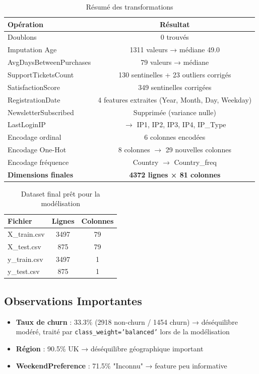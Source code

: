 \documentclass[11pt,a4paper]{article}
\begin{document}
\begin{table}[H]
	\centering
	\caption{Résumé des transformations}
	\label{tab:transformations}
	\begin{tabular}{|l|c|}
		\hline
		\textbf{Opération} & \textbf{Résultat} \\
		\hline
		Doublons & 0 trouvés \\
		\hline
		Imputation Age & 1311 valeurs → médiane 49.0 \\
		\hline
		AvgDaysBetweenPurchases & 79 valeurs → médiane \\
		\hline
		SupportTicketsCount & 130 sentinelles + 23 outliers corrigés \\
		\hline
		SatisfactionScore & 349 sentinelles corrigées \\
		\hline
		RegistrationDate & 4 features extraites (Year, Month, Day, Weekday) \\
		\hline
		NewsletterSubscribed & Supprimée (variance nulle) \\
		\hline
		LastLoginIP & $\rightarrow$ IP1, IP2, IP3, IP4, IP\_Type \\
		\hline
		Encodage ordinal & 6 colonnes encodées \\
		\hline
		Encodage One-Hot & 8 colonnes $\rightarrow$ 29 nouvelles colonnes \\
		\hline
		Encodage fréquence & Country $\rightarrow$ Country\_freq \\
		\hline
		\textbf{Dimensions finales} & \textbf{4372 lignes × 81 colonnes} \\
		\hline
		\end{tabular}
	\end{table}
\begin{table}[H]
	\centering
	\caption{Dataset final prêt pour la modélisation}
	\label{tab:final_data}
	\begin{tabular}{|l|c|c|}
		\hline
		\textbf{Fichier} & \textbf{Lignes} & \textbf{Colonnes} \\
		\hline
		X\_train.csv & 3497 & 79 \\
		X\_test.csv & 875 & 79 \\
		y\_train.csv & 3497 & 1 \\
		y\_test.csv & 875 & 1 \\
		\hline
	\end{tabular}
\end{table}
\subsection{Observations Importantes}
\begin{itemize}
	\item \textbf{Taux de churn} : 33.3\% (2918 non-churn / 1454 churn) → déséquilibre modéré, traité par \texttt{class\_weight='balanced'} lors de la modélisation
	\item \textbf{Région} : 90.5\% UK → déséquilibre géographique important
	\item \textbf{WeekendPreference} : 71.5\% "Inconnu" → feature peu informative
\end{itemize}
\end{document}
